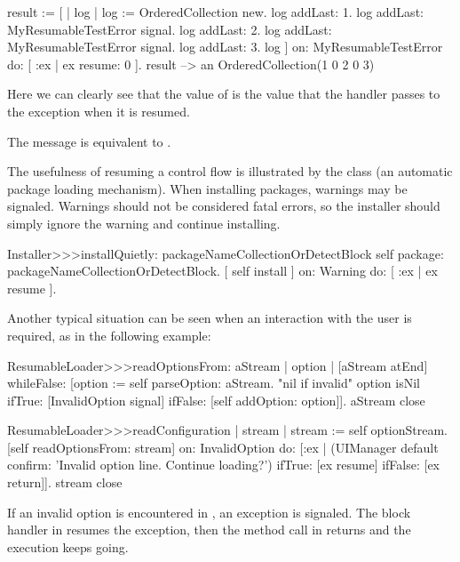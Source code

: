 \documentclass[a4paper,10pt,twoside]{book}
\begin{document}
\begin{code}{}
result := [ | log |
	log := OrderedCollection new.
	log addLast: 1.
	log addLast: MyResumableTestError signal. 
	log addLast: 2.
	log addLast: MyResumableTestError signal.
	log addLast: 3.
	log ] 
		on: MyResumableTestError 
		do: [ :ex |  ex resume: 0 ].
result --> an OrderedCollection(1 0 2 0 3)
\end{code}
Here we can clearly see that the value of  is the value that the handler passes to the exception when it is resumed.

The message  is equivalent to .

The usefulness of resuming a control flow is illustrated by the class  (an automatic package loading mechanism). When installing packages, warnings may be signaled. Warnings should not be considered fatal errors, so the installer should simply ignore the warning and continue installing. 

\begin{code}{}
Installer>>>installQuietly: packageNameCollectionOrDetectBlock 
	self package: packageNameCollectionOrDetectBlock. 
	 [ self install ] on: Warning do: [ :ex | ex resume ]. 
\end{code}


Another typical situation can be seen when an interaction with the user is required, as in the following example:
\begin{code}{}
ResumableLoader>>>readOptionsFrom: aStream 
	| option |
	[aStream atEnd]
		whileFalse: [option := self parseOption: aStream.
			"nil if invalid"
			option isNil
				ifTrue: [InvalidOption signal]
				ifFalse: [self addOption: option]].
	aStream close

ResumableLoader>>>readConfiguration
	| stream |
	stream := self optionStream.
	[self readOptionsFrom: stream]
		on: InvalidOption
		do: [:ex | (UIManager default confirm: 'Invalid option line. Continue loading?')
				ifTrue: [ex resume]
				ifFalse: [ex return]].
	stream close
\end{code}

If an invalid option is encountered in , an  exception is signaled. The block handler in  resumes the exception, then the  method call in  returns and the execution keeps going.
\end{document}
